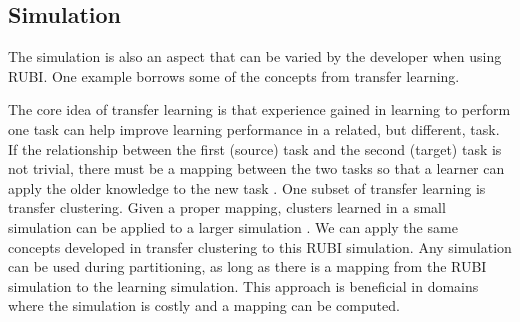 \documentclass[smallcondensed]{svjour3}
\begin{document}
\subsection{Simulation}
The simulation is also an aspect that can be varied by the developer when using RUBI. One example borrows some of the concepts from transfer learning.

The core idea of transfer learning is that experience gained in learning to perform one task can help improve learning performance in a related, but different, task. If the relationship between the first (source) task and the second (target) task is not trivial, there must be a mapping between the two tasks so that a learner can apply the older knowledge to the new task \cite{Taylor:2009:TLR:1577069.1755839}. One subset of transfer learning is transfer clustering. Given a proper mapping, clusters learned in a small simulation can be applied to a larger simulation \cite{6378284}. We can apply the same concepts developed in transfer clustering to this RUBI simulation. Any simulation can be used during partitioning, as long as there is a mapping from the RUBI simulation to the learning simulation. This approach is beneficial in domains where the simulation is costly and a mapping can be computed. 



\end{document}
